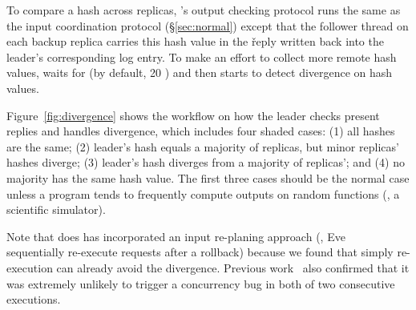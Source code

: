 To compare a hash across replicas, \xxx's output checking protocol runs the 
same as the input coordination protocol (\S\ref{sec:normal}) except that the 
follower thread on each backup replica carries this hash value in the \v{reply} 
written back into the leader's corresponding log entry. To make an effort to 
collect more remote hash values, \xxx waits for \twait (by default, 20 \us) 
and then starts to detect divergence on hash values.


Figure~\ref{fig:divergence} shows the workflow on how the leader checks 
present replies and handles divergence, which includes four shaded cases: 
(1) all hashes are the same; (2) leader's hash equals a majority of replicas, 
but minor replicas' hashes diverge; (3) leader's hash diverges from a majority 
of replicas'; and (4) no majority has the same hash value. The first three 
cases should be the normal case unless a program tends to frequently compute 
outputs on random functions (\eg, a scientific simulator).

Note that \xxx does has incorporated an input re-planing approach (\eg, 
Eve~\cite{eve:osdi12} sequentially re-execute requests after a rollback) because 
we found that simply re-execution can already avoid the divergence. Previous 
work~\cite{lu:concurrency-bugs,pres:sosp09} also confirmed that it was 
extremely unlikely to trigger a concurrency bug in both of two consecutive 
executions.


